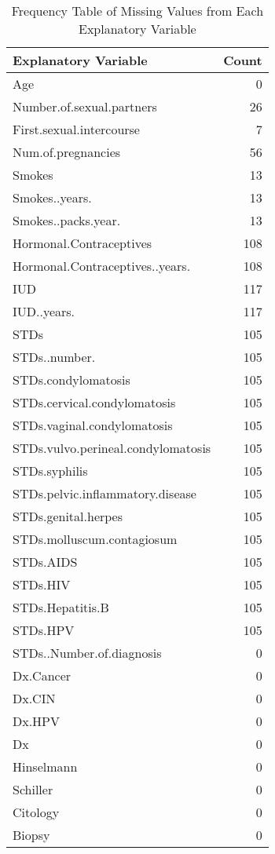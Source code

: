 \documentclass[12pt]{article}
\numberwithin{equation}{section}
\begin{document}
\begin{table}
\caption{Frequency Table of Missing Values from Each Explanatory Variable}
\centering
\begin{tabular}[t]{l|r}
\hline
Explanatory Variable & Count\\
\hline
Age & 0\\
\hline
Number.of.sexual.partners & 26\\
\hline
First.sexual.intercourse & 7\\
\hline
Num.of.pregnancies & 56\\
\hline
Smokes & 13\\
\hline
Smokes..years. & 13\\
\hline
Smokes..packs.year. & 13\\
\hline
Hormonal.Contraceptives & 108\\
\hline
Hormonal.Contraceptives..years. & 108\\
\hline
IUD & 117\\
\hline
IUD..years. & 117\\
\hline
STDs & 105\\
\hline
STDs..number. & 105\\
\hline
STDs.condylomatosis & 105\\
\hline
STDs.cervical.condylomatosis & 105\\
\hline
STDs.vaginal.condylomatosis & 105\\
\hline
STDs.vulvo.perineal.condylomatosis & 105\\
\hline
STDs.syphilis & 105\\
\hline
STDs.pelvic.inflammatory.disease & 105\\
\hline
STDs.genital.herpes & 105\\
\hline
STDs.molluscum.contagiosum & 105\\
\hline
STDs.AIDS & 105\\
\hline
STDs.HIV & 105\\
\hline
STDs.Hepatitis.B & 105\\
\hline
STDs.HPV & 105\\
\hline
STDs..Number.of.diagnosis & 0\\
\hline
Dx.Cancer & 0\\
\hline
Dx.CIN & 0\\
\hline
Dx.HPV & 0\\
\hline
Dx & 0\\
\hline
Hinselmann & 0\\
\hline
Schiller & 0\\
\hline
Citology & 0\\
\hline
Biopsy & 0\\
\hline
\end{tabular}
\end{table}
\end{document}
